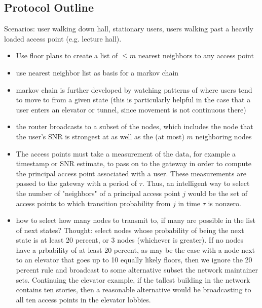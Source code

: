 \documentclass[letterpaper,12pt]{article}
\begin{document}
\subsection{Protocol Outline}

Scenarios: user walking down hall, stationary users, users walking past
a heavily loaded access point (e.g. lecture hall).

\begin{itemize}
\item Use floor plans to create a list of $\le m$ nearest neighbors to any access point

\item use nearest neighbor list as basis for a markov chain

\item markov chain is further developed by watching patterns of where users tend 
to move to from a given state (this is particularly helpful in the case that a user
enters an elevator or tunnel, since movement is not continuous there)

\item the router broadcasts to a subset of the nodes, which includes the node 
that the user's SNR is strongest at as well as the (at most) $m$ neighboring nodes

\item The access points must take a measurement of the data, for example a timestamp or SNR estimate, to pass on to the gateway in order to compute the principal access point associated with a user.  These measurements are passed to the gateway with a period of $\tau$.  Thus, an intelligent way to select the number of "neighbors" of a principal access point $j$ would be the set of access points to which transition probability from $j$ in time $\tau$ is nonzero.

\item how to select how many nodes to transmit to, if many are possible in the
list of next states? Thought: select nodes whose probability of being the next 
state is at least 20 percent, or 3 nodes (whichever is greater). If no nodes
have a prbability of at least 20 percent, as may be the case with a node next 
to an elevator that goes up to 10 equally likely floors, then we ignore the 20 
percent rule and broadcast to some alternative subset the network maintainer sets.
Continuing the elevator example, if the tallest building in the network contains
ten stories, then a reasonable alternative would be broadcasting to all ten
access points in the elevator lobbies.


\end{itemize}
\end{document}
